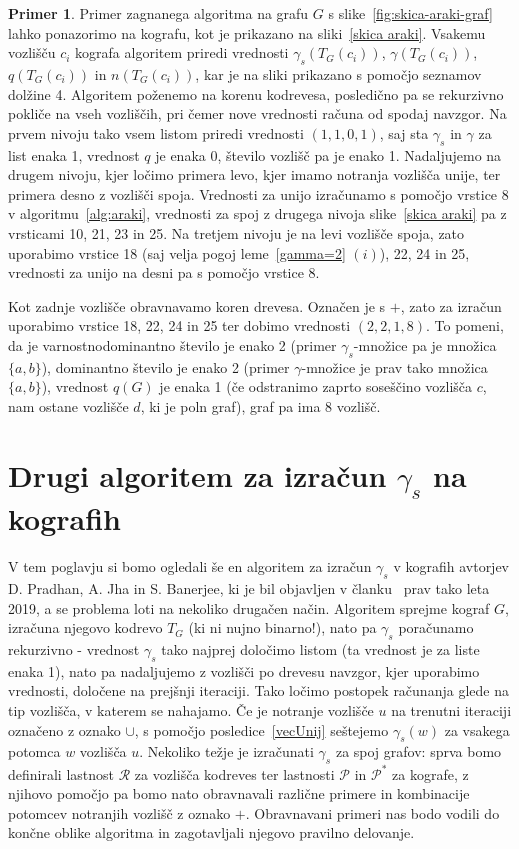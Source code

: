\documentclass[12pt,a4paper,twoside]{article}
\theoremstyle{definition} %
\newtheorem{primer}[definicija]{Primer}
\theoremstyle{plain} %
\numberwithin{equation}{section}  %
\begin{document}
\begin{primer}
Primer zagnanega algoritma na grafu $G$ s slike~\ref{fig:skica-araki-graf} lahko ponazorimo na kografu, kot je prikazano na sliki~\ref{skica araki}. Vsakemu vozlišču $c_i$ kografa algoritem priredi vrednosti $\gamma_s(T_G(c_i))$, $\gamma(T_G(c_i))$, $q(T_G(c_i))$ in $n(T_G(c_i))$, kar je na sliki prikazano s pomočjo seznamov dolžine 4. Algoritem poženemo na korenu kodrevesa, posledično pa se rekurzivno pokliče na vseh vozliščih, pri čemer nove vrednosti računa od spodaj navzgor. Na prvem nivoju tako vsem listom priredi vrednosti $(1,1,0,1)$, saj sta $\gamma_s$ in $\gamma$ za list enaka 1, vrednost $q$ je enaka 0, število vozlišč pa je enako 1. Nadaljujemo na drugem nivoju, kjer ločimo primera levo, kjer imamo notranja vozlišča unije, ter primera desno z vozlišči spoja. Vrednosti za unijo izračunamo s pomočjo vrstice 8 v algoritmu~\ref{alg:araki}, vrednosti za spoj z drugega nivoja slike~\ref{skica araki} pa z vrsticami 10, 21, 23 in 25. Na tretjem nivoju je na levi vozlišče spoja, zato uporabimo vrstice 18 (saj velja pogoj leme~\ref{gamma=2} $(i)$), 22, 24 in 25, vrednosti za unijo na desni pa s pomočjo vrstice 8.

Kot zadnje vozlišče obravnavamo koren drevesa. Označen je s $+$, zato za izračun uporabimo vrstice 18, 22, 24 in 25 ter dobimo vrednosti $(2,2,1,8)$.  To pomeni, da je varnostnodominantno število je enako 2 (primer $\gamma_s$-množice pa je množica $\{a, b\}$), dominantno število je enako 2 (primer $\gamma$-množice je prav tako množica $\{a, b\}$), vrednost $q(G)$ je enaka 1 (če odstranimo zaprto soseščino vozlišča $c$, nam ostane vozlišče $d$, ki je poln graf), graf pa ima 8 vozlišč.
\end{primer}

\pagebreak
\section{Drugi algoritem za izračun $\gamma_s$ na kografih}\label{sec:drugialgoritem}
V tem poglavju si bomo ogledali še en algoritem za izračun $\gamma_s$ v kografih avtorjev D. Pradhan, A. Jha in S. Banerjee, ki je bil objavljen v članku~\cite{jha2019secure} prav tako leta 2019, a se problema loti na nekoliko drugačen način. Algoritem sprejme kograf $G$, izračuna njegovo kodrevo $T_G$ (ki ni nujno binarno!), nato pa $\gamma_s$ poračunamo rekurzivno - vrednost $\gamma_s$ tako najprej določimo listom (ta vrednost je za liste enaka 1), nato pa nadaljujemo z vozlišči po drevesu navzgor, kjer uporabimo vrednosti, določene na prejšnji iteraciji. Tako ločimo postopek računanja glede na tip vozlišča, v katerem se nahajamo. Če je notranje vozlišče $u$ na trenutni iteraciji označeno z oznako $\cup$, s pomočjo posledice~\ref{vecUnij} seštejemo $\gamma_s(w)$ za vsakega potomca $w$ vozlišča $u$. Nekoliko težje je izračunati $\gamma_s$ za spoj grafov: sprva bomo definirali lastnost $\mathcal{R}$ za vozlišča kodreves ter lastnosti $\mathcal{P}$ in $\mathcal{P^*}$ za kografe, z njihovo pomočjo pa bomo nato obravnavali različne primere in kombinacije potomcev notranjih vozlišč z oznako $+$. Obravnavani primeri nas bodo vodili do končne oblike algoritma in zagotavljali njegovo pravilno delovanje.
\end{document}
